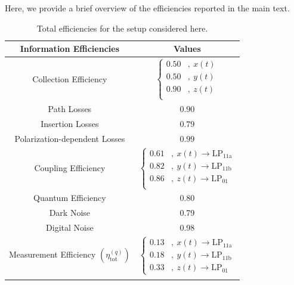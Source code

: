 \documentclass[%
 reprint,
 amsmath,amssymb,
 aps,
pra,
]{revtex4-2}
\begin{document}
Here, we provide a brief overview of the efficiencies reported in the main text.

\begin{table}[ht]
    \centering
    \begin{tabular}{c c}
        \hline
        \hline
        \textbf{Information Efficiencies} & \textbf{Values} \\
        \hline 
        \hline \noalign{\smallskip}
        Collection Efficiency & $\begin{cases}
            0.50 & ,~ x(t) \\
            0.50 & ,~ y(t) \\
            0.90 & ,~ z(t) \\
        \end{cases}$ \\
        Path Losses & $0.90$ \\
        Insertion Losses & $0.79$ \\
        Polarization-dependent Losses & $0.99$ \\
        Coupling Efficiency & $\begin{cases}
            0.61 & ,~ x(t) \to \mathrm{LP}_{11\mathrm{a}} \\
            0.82 & ,~ y(t) \to \mathrm{LP}_{11\mathrm{b}} \\
            0.86 & ,~ z(t) \to \mathrm{LP}_{01} \\
        \end{cases}$ \\
        Quantum Efficiency & 0.80 \\
        Dark Noise & 0.79 \\
        Digital Noise & 0.98 \\
        \hline \noalign{\smallskip}
        Measurement Efficiency $\left(\eta^{(q)}_{\mathrm{tot}}\right)$ & $\begin{cases}
            0.13 & ,~ x(t) \to \mathrm{LP}_{11\mathrm{a}} \\
            0.18 & ,~ y(t) \to \mathrm{LP}_{11\mathrm{b}} \\
            0.33 & ,~ z(t) \to \mathrm{LP}_{01}
        \end{cases}$ \\
        \noalign{\smallskip} \hline
        \hline
    \end{tabular}
    \caption{
        Total efficiencies for the setup considered here.
    }
    \label{tab:LossesTableMainText}
\end{table}
\end{document}
